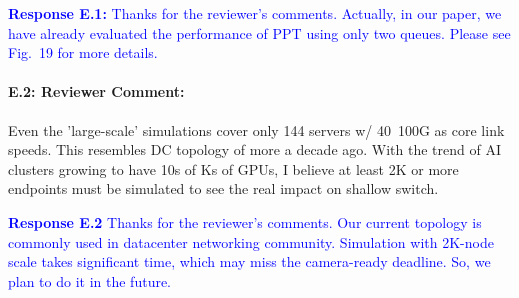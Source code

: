 \documentclass[12pt,one-column]{article}
\begin{document}
\noindent\textcolor{blue}{\textbf{Response E.1:}
Thanks for the reviewer’s comments. 
Actually, in our paper, we have already evaluated the performance of PPT using only two queues. Please see Fig.~19 for more details.
}

{\it \paragraph{E.2: Reviewer Comment:} Even the 'large-scale' simulations cover only 144 servers w/ 40~100G as core link speeds. This resembles DC topology of more a decade ago. With the trend of AI clusters growing to have 10s of Ks of GPUs, I believe at least 2K or more endpoints must be simulated to see the real impact on shallow switch.}

\noindent\textcolor{blue}{\textbf{Response E.2}
Thanks for the reviewer’s comments. 
Our current topology is commonly used in datacenter networking community.
Simulation with 2K-node scale takes significant time, which may miss the camera-ready deadline.  So, we plan to do it in the future.
} 







%
%
\end{document}
